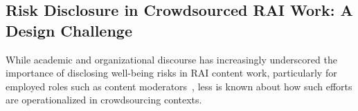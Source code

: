 \subsection{Risk Disclosure in Crowdsourced RAI Work: A Design Challenge}
While academic and organizational discourse has increasingly underscored the importance of disclosing well-being risks in RAI content work, particularly for employed roles such as content moderators~\cite{bharucha2023content, qian2025locating}, less is known about how such efforts are operationalized in crowdsourcing contexts. %


